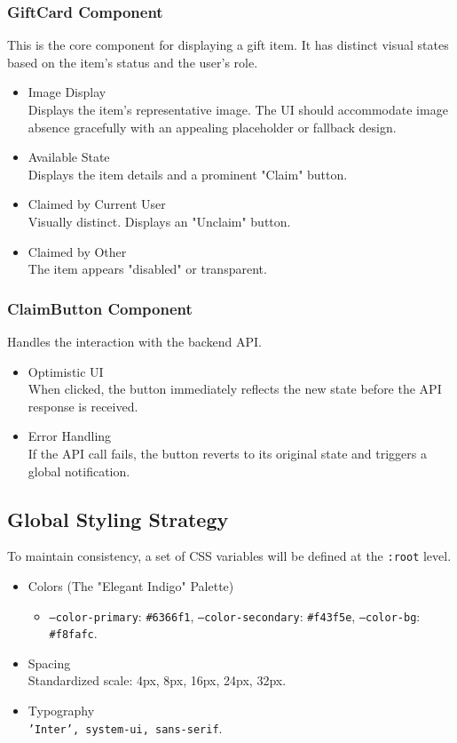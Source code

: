 \subsubsection{GiftCard Component}
This is the core component for displaying a gift item. It has distinct visual states based on the item's status and the user's role.
\begin{itemize}
    \item Image Display \\
        Displays the item's representative image. The UI should accommodate image absence gracefully with an appealing placeholder or fallback design.
    \item Available State \\
        Displays the item details and a prominent "Claim" button.
    \item Claimed by Current User \\
        Visually distinct. Displays an "Unclaim" button.
    \item Claimed by Other \\
        The item appears "disabled" or transparent.
\end{itemize}

\subsubsection{ClaimButton Component}
Handles the interaction with the backend API.
\begin{itemize}
    \item Optimistic UI \\
        When clicked, the button immediately reflects the new state before the API response is received.
    \item Error Handling \\
        If the API call fails, the button reverts to its original state and triggers a global notification.
\end{itemize}

\subsection{Global Styling Strategy}
To maintain consistency, a set of CSS variables will be defined at the \texttt{:root} level.

\begin{itemize}
    \item Colors (The "Elegant Indigo" Palette) \\
    \begin{itemize}
        \item \texttt{--color-primary}: \texttt{\#6366f1}, \texttt{--color-secondary}: \texttt{\#f43f5e}, \texttt{--color-bg}: \texttt{\#f8fafc}.
    \end{itemize}
    \item Spacing \\
        Standardized scale: 4px, 8px, 16px, 24px, 32px.
    \item Typography \\
        \texttt{'Inter', system-ui, sans-serif}.
\end{itemize}

